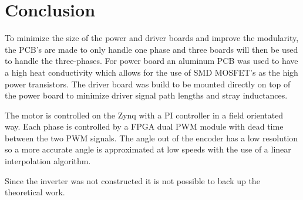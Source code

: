 \section{Conclusion}
\label{sec:conclusion}


To minimize the size of the power and driver boards and improve the modularity, the PCB's are made to only handle one phase and three boards will then be used to handle the three-phases.
For power board an aluminum PCB was used to have a high heat conductivity which allows for the use of SMD MOSFET's as the high power transistors. The driver board was build to be mounted directly on top of the power board to minimize driver signal path lengths and stray inductances.

The motor is controlled on the Zynq with a PI controller in a field orientated way. Each phase is controlled by a FPGA dual PWM module with dead time between the two PWM signals.
The angle out of the encoder has a low resolution so a more accurate angle is approximated at low speeds with the use of a linear interpolation algorithm. 

Since the inverter was not constructed it is not possible to back up the theoretical work.


